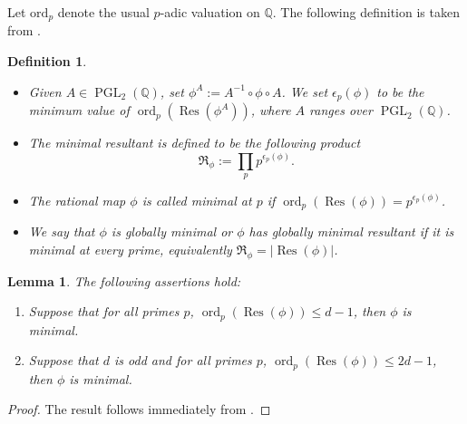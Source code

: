 \documentclass[12pt]{amsart}
\newtheorem{lemma}[theorem]{Lemma}
\newtheorem{definition}[theorem]{Definition}
\newcommand{\ord}{\mathrm{ord}}
\newcommand{\Q}{\mathbb{Q}}
\newcommand{\op}[1]{\operatorname{#1}}
\numberwithin{equation}{section}
\begin{document}
Let $\ord_p$ denote the usual $p$-adic valuation on $\Q$. The following definition
is taken from \cite[Chapter~4]{silvermantextbook}.
\begin{definition}
    \begin{itemize}
        \item Given $A\in \op{PGL}_2(\Q)$, set $\phi^A:=A^{-1}\circ \phi \circ A$. We set $\epsilon_p(\phi)$ to be the minimum value of $\op{ord}_p(\op{Res}(\phi^A))$, where $A$ ranges over $\op{PGL}_2(\Q)$.
        \item The \emph{minimal resultant} is defined to be the following product \[\mathfrak{R}_\phi:=\prod_p p^{\epsilon_p(\phi)}.\]
        \item The rational map $\phi$ is called \emph{minimal at $p$} if 
        $\op{ord}_p\left(\op{Res}(\phi)\right)=p^{\epsilon_p(\phi)}$.
        \item We say that $\phi$ is \emph{globally minimal} or $\phi$ has globally minimal resultant if it is minimal at every prime, equivalently $\mathfrak{R}_\phi=|\op{Res}(\phi)|$.
    \end{itemize}  
    \end{definition}

    
\begin{lemma}\label{d-1 lemma}
 The following assertions hold:
 \begin{enumerate}
     \item Suppose that for all primes $p$, $\op{ord}_p \left(\op{Res}(\phi)\right)\leq d-1$, then $\phi$ is minimal.
     \item Suppose that $d$ is odd and for all primes $p$, $\op{ord}_p \left(\op{Res}(\phi)\right)\leq 2d-1$, then $\phi$ is minimal.
 \end{enumerate}
   \end{lemma} 
   \begin{proof}
      The result follows immediately from \cite[Proposition 4.95]{silvermantextbook}.
   \end{proof}
\end{document}
